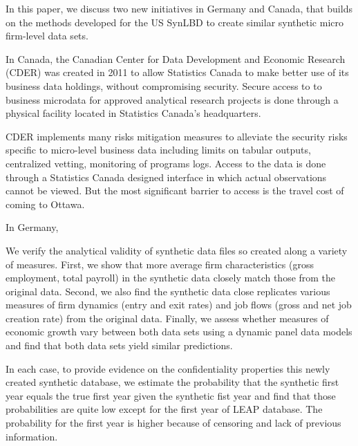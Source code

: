 
In this paper, we discuss two new initiatives in Germany and Canada, that builds on the methods developed for the US SynLBD to create similar synthetic micro firm-level data sets. 

In Canada, the Canadian Center for Data Development and Economic Research (CDER) was created in 2011 to allow Statistics Canada to make better use of its business data holdings, without compromising security. Secure access to to business microdata for approved analytical research projects is done through a physical facility located in Statistics Canada’s headquarters. 

CDER implements many risks mitigation measures to alleviate the security risks specific to micro-level business data including limits on tabular outputs, centralized vetting, monitoring of programs logs. Access to the data is done through a Statistics Canada designed interface in which actual observations cannot be viewed. But the most significant barrier to access is the travel cost of coming to Ottawa.

In Germany, 


We verify the analytical validity of synthetic data files so created along a variety of measures. First, we show that more average firm characteristics (gross employment, total payroll) in the synthetic data closely match those from the original data. Second, we also find the synthetic data close replicates various measures of firm dynamics (entry and exit rates) and job flows (gross and net job creation rate) from the original data. Finally, we assess whether measures of economic growth vary between both data sets using a dynamic panel data models and find that both data sets yield similar predictions.

In each case, to provide evidence on the confidentiality properties this newly created  synthetic database, we estimate the probability that the synthetic first year equals the true first year given the synthetic fist year and find that those probabilities are quite low except for the first year of LEAP database. The probability for the first year is higher because of censoring and lack of previous information.

